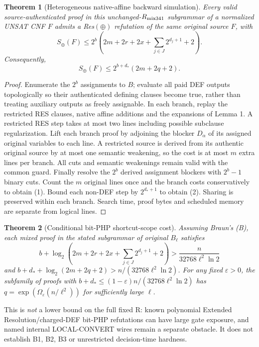\documentclass[11pt]{article}
\newtheorem{theorem}{Theorem}
\begin{document}
\begin{theorem}[Heterogeneous native-affine backward simulation]
Every valid source-authenticated proof in this unchanged-$R_{\rm mix341}$ subgrammar of a normalized UNSAT CNF $F$ admits a Res$(\oplus)$ refutation \emph{of the same original source $F$}, with
\[
\boxed{S_\oplus(F)\le 2^b\left(2m+2r+2x+\sum_{j\in J}2^{d_j+1}+2\right).}\tag{1}
\]
Consequently,
\[
\boxed{S_\oplus(F)\le2^{b+d_*}(2m+2q+2).}\tag{2}
\]
\end{theorem}
\begin{proof}
Enumerate the $2^b$ assignments to $B$; evaluate all paid DEF outputs topologically so their authenticated defining clauses become true, rather than treating auxiliary outputs as freely assignable. In each branch, replay the restricted RES clauses, native affine additions and the expansions of Lemma 1. A restricted RES step takes at most two lines including possible subclause regularization. Lift each branch proof by adjoining the blocker $D_\alpha$ of its assigned original variables to each line. A restricted source is derived from its authentic original source by at most one semantic weakening, so the cost is at most $m$ extra lines per branch. All cuts and semantic weakenings remain valid with the common guard. Finally resolve the $2^b$ derived assignment blockers with $2^b-1$ binary cuts. Count the $m$ original lines once and the branch costs conservatively to obtain (1). Bound each non-DEF step by $2^{d_*+1}$ to obtain (2). Sharing is preserved within each branch. Search time, proof bytes and scheduled memory are separate from logical lines.
\end{proof}

\begin{theorem}[Conditional bit-PHP shortcut-scope cost]
Assuming Braun's (B), each mixed proof in the stated subgrammar of original $B_\ell$ satisfies
\[
\boxed{b+\log_2\!\left(2m+2r+2x+\sum_{j\in J}2^{d_j+1}+2\right)>\frac{n}{32768\ell^2\ln2}}
\]
and $b+d_*+\log_2(2m+2q+2)>n/(32768\ell^2\ln2)$. For any fixed $\varepsilon>0$, the subfamily of proofs with $b+d_*\le(1-\varepsilon)n/(32768\ell^2\ln2)$ has $q=\exp(\Omega_\varepsilon(n/\ell^2))$ for sufficiently large $\ell$.
\end{theorem}
\noindent This is \emph{not} a lower bound on the full fixed R: known polynomial Extended Resolution/charged-DEF bit-PHP refutations can have large gate exposure, and named internal LOCAL-CONVERT wires remain a separate obstacle. It does not establish B1, B2, B3 or unrestricted decision-time hardness.
\end{document}
